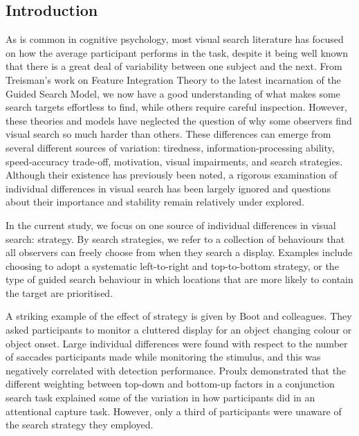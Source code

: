\documentclass[]{rsos}%
\begin{document}
\begin{fmtext}
\section{Introduction}

As is common in cognitive psychology, most visual search literature has focused on how the average participant performs in the task, despite it being well known that there is a great deal of variability between one subject and the next. From Treisman's work on Feature Integration Theory\cite{treisman1980} to the latest incarnation of the Guided Search Model\cite{wolfe2015}, we now have a good understanding of what makes some search targets effortless to find, while others require careful inspection. However, these theories and models have neglected the question of why some observers find visual search so much harder than others. These differences can emerge from several different sources of variation: tiredness\cite{mackworth1948}, information-processing ability, speed-accuracy trade-off, motivation, visual impairments\cite{nowakowska2016}, and search strategies\cite{boot2006}. Although their existence has previously been noted\cite{mackworth1948}, a rigorous examination of individual differences in visual search has been largely ignored and questions about their importance and stability remain relatively under explored. 

In the current study, we focus on one source of individual differences in visual search: strategy. By search strategies, we refer to a collection of behaviours that all observers can freely choose from when they search a display. Examples include choosing to adopt a systematic left-to-right and top-to-bottom strategy\cite{gilchrist2006}, or the type of guided search behaviour in which locations that are more likely to contain the target are prioritised\cite{wolfe2015}. 
\end{fmtext}
\maketitle
\twocolumn
A striking example of the effect of strategy is given by Boot and colleagues\cite{boot2006}. They asked participants to monitor a cluttered display for an object changing colour or object onset. Large individual differences were found with respect to the number of saccades participants made while monitoring the stimulus, and this was negatively correlated with detection performance. Proulx\cite{proulx2011} demonstrated that the different weighting between top-down and bottom-up factors in a conjunction search task explained some of the variation in how participants did in an attentional capture task. However, only a third of participants were unaware of the search strategy they employed. 
\end{document}
